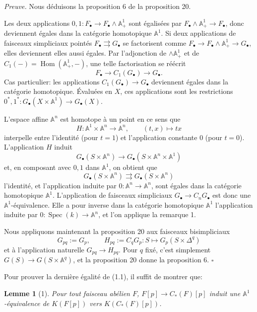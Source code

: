 \documentclass[11pt]{article}
\newcommand{\Aone}{\mathbb A^1}
\newcommand{\A}{\mathbb A}
\newcommand{\Spec}{\operatorname{Spec}}
\newcommand{\Hom}{\operatorname{Hom}}
\theoremstyle{deligne}
\newtheorem*{lemma*}{Lemme}
\newenvironment{proofdel}{\noindent\textit{Preuve.}}{\hfill$\square$}
\begin{document}
\begin{proofdel}
Nous déduisons la proposition 6 de la proposition 20.

Les deux applications \(0,1:F_\bullet\to F_\bullet\wedge\Aone_+\) sont égalisées par \(F_\bullet\wedge\Aone_+\to F_\bullet\), donc deviennent égales dans la catégorie homotopique \(\Aone\). Si deux applications de faisceaux simpliciaux pointés \(F_\bullet\rightrightarrows G_\bullet\) se factorisent comme \(F_\bullet\to F_\bullet\wedge\Aone_+\to G_\bullet\), elles deviennent elles aussi égales. Par l'adjonction de \(\wedge\Aone_+\) et de \(C_1(-)=\Hom(\Aone_+,-)\), une telle factorisation se réécrit
\[
F_\bullet\longrightarrow C_1(G_\bullet)\longrightarrow G_\bullet.
\]
Cas particulier: les applications \(C_1(G_\bullet)\to G_\bullet\) deviennent égales dans la catégorie homotopique. Évaluées en \(X\), ces applications sont les restrictions \(0^*,1^*:G_\bullet(X\times\Aone)\to G_\bullet(X)\).

L'espace affine \(\A^n\) est homotope à un point en ce sens que
\[
H:\Aone\times\A^n\longrightarrow\A^n,\qquad (t,x)\longmapsto tx
\]
interpelle entre l'identité (pour \(t=1\)) et l'application constante \(0\) (pour \(t=0\)). L'application \(H\) induit
\[
G_\bullet(S\times\A^n)\longrightarrow G_\bullet(S\times\A^n\times\Aone)
\]
et, en composant avec \(0,1\) dans \(\Aone\), on obtient que
\[
G_\bullet(S\times\A^n)\rightrightarrows G_\bullet(S\times\A^n)
\]
l'identité, et l'application induite par \(0:\A^n\to\A^n\), sont égales dans la catégorie homotopique \(\Aone\). L'application de faisceaux simpliciaux \(G_\bullet\to C_nG_\bullet\) est donc une \(\Aone\)-équivalence. Elle a pour inverse dans la catégorie homotopique \(\Aone\) l'application induite par \(0:\Spec(k)\to\A^n\), et l'on applique la remarque 1.

Nous appliquons maintenant la proposition 20 aux faisceaux bisimpliciaux
\[
G_{pq}:=G_p,\qquad
H_{pq}:=C_qG_p:S\longmapsto G_p(S\times\Delta^q)
\]
et à l'application naturelle \(G_{pq}\to H_{pq}\). Pour \(q\) fixé, c'est simplement \(G(S)\to G(S\times\A^q)\), et la proposition 20 donne la proposition 6.
\end{proofdel}

Pour prouver la dernière égalité de (1.1), il suffit de montrer que:

\begin{lemma*}[1]
Pour tout faisceau abélien \(F\), \(F[p]\to C_*(F)[p]\) induit une \(\Aone\)-équivalence de \(K(F[p])\) vers \(K(C_*(F)[p])\).
\end{lemma*}
\end{document}
